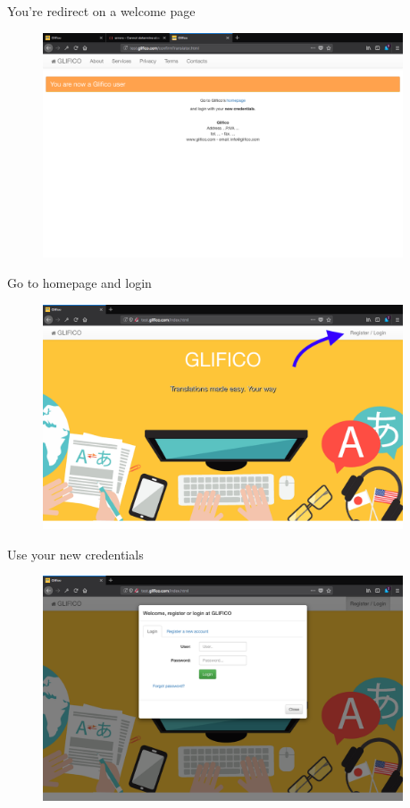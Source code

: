 \documentclass[11 pt, a4paper]{article}
\begin{document}
You're redirect on a welcome page
\begin{figure}[H]
\centering
\includegraphics[width=0.95\textwidth]{register_translator7.png}
\end{figure}

\clearpage
Go to homepage and login
\begin{figure}[H]
\centering
\includegraphics[width=0.95\textwidth]{register_translator0.png}
\end{figure}

Use your new credentials
\begin{figure}[H]
\centering
\includegraphics[width=0.95\textwidth]{login.png}
\end{figure}
\end{document}
